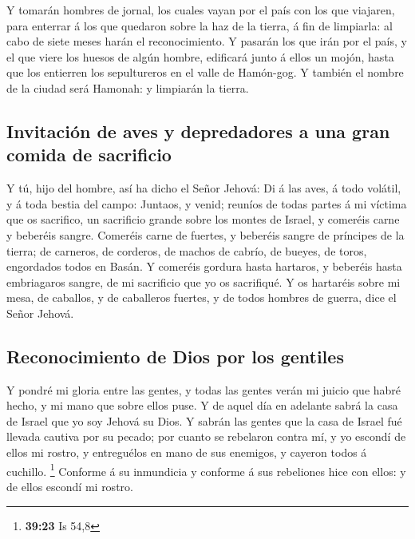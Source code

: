  Y tomarán hombres de jornal, los cuales vayan por el país
con los que viajaren, para enterrar á los que quedaron sobre la haz de
la tierra, á fin de limpiarla: al cabo de siete meses harán el
reconocimiento.  Y pasarán los que irán por el país, y el
que viere los huesos de algún hombre, edificará junto á ellos un mojón,
hasta que los entierren los sepultureros en el valle de Hamón-gog.
 Y también el nombre de la ciudad será Hamonah: y limpiarán
la tierra.

\hypertarget{invitaciuxf3n-de-aves-y-depredadores-a-una-gran-comida-de-sacrificio}{%
\subsection{Invitación de aves y depredadores a una gran comida de
sacrificio}\label{invitaciuxf3n-de-aves-y-depredadores-a-una-gran-comida-de-sacrificio}}

 Y tú, hijo del hombre, así ha dicho el Señor Jehová: Di á
las aves, á todo volátil, y á toda bestia del campo: Juntaos, y venid;
reuníos de todas partes á mi víctima que os sacrifico, un sacrificio
grande sobre los montes de Israel, y comeréis carne y beberéis sangre.
 Comeréis carne de fuertes, y beberéis sangre de príncipes
de la tierra; de carneros, de corderos, de machos de cabrío, de bueyes,
de toros, engordados todos en Basán.  Y comeréis gordura
hasta hartaros, y beberéis hasta embriagaros sangre, de mi sacrificio
que yo os sacrifiqué.  Y os hartaréis sobre mi mesa, de
caballos, y de caballeros fuertes, y de todos hombres de guerra, dice el
Señor Jehová.

\hypertarget{reconocimiento-de-dios-por-los-gentiles}{%
\subsection{Reconocimiento de Dios por los
gentiles}\label{reconocimiento-de-dios-por-los-gentiles}}

 Y pondré mi gloria entre las gentes, y todas las gentes
verán mi juicio que habré hecho, y mi mano que sobre ellos puse.
 Y de aquel día en adelante sabrá la casa de Israel que yo
soy Jehová su Dios.  Y sabrán las gentes que la casa de
Israel fué llevada cautiva por su pecado; por cuanto se rebelaron contra
mí, y yo escondí de ellos mi rostro, y entreguélos en mano de sus
enemigos, y cayeron todos á cuchillo. \footnote{\textbf{39:23} Is 54,8}
 Conforme á su inmundicia y conforme á sus rebeliones hice
con ellos: y de ellos escondí mi rostro.

